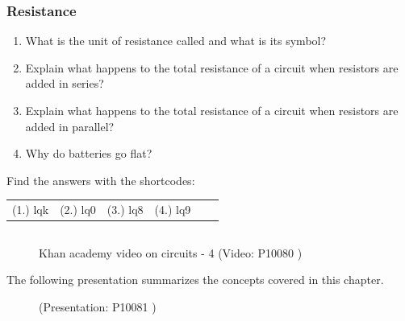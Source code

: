             \subsubsection{  Resistance }
            \nopagebreak
          \label{m38776*id67542}\begin{enumerate}[noitemsep, label=\textbf{\arabic*}. ] 
            \label{m38776*uid68}\item What is the unit of resistance called and what is its symbol?         
\label{m38776*uid69}\item Explain what happens to the total resistance of a circuit when resistors are added in series?         
\label{m38776*uid70}\item Explain what happens to the total resistance of a circuit when resistors are added in parallel?         
\label{m38776*uid71}\item Why do batteries go flat?         
\end{enumerate}
   \label{m38776*sb9871}
\par {} Find the answers with the shortcodes:
 \par \begin{tabular}[h]{cccccc}
 (1.) lqk  &  (2.) lq0  &  (3.) lq8  &  (4.) lq9  & \end{tabular}
            \subsection{ }
            \nopagebreak
    \setcounter{subfigure}{0}
	\begin{figure}[H] %
    \textnormal{Khan academy video on circuits - 4}\vspace{.1in} \nopagebreak
  \label{m38776*yt-media4}\label{m38776*yt-video4}
             { (Video:  P10080 )}
      \vspace{2pt}
    \vspace{.1in}
 \end{figure}       
    \label{m38776*eip-872}The following presentation summarizes the concepts covered in this chapter. 
    \setcounter{subfigure}{0}
	\begin{figure}[H] %
        \label{m38776*slidesharemedia}\label{m38776*slideshareflash} { (Presentation:  P10081 )}
      \vspace{2pt}
    \vspace{.1in}
 \end{figure}       
    \label{m38776*cid7}
